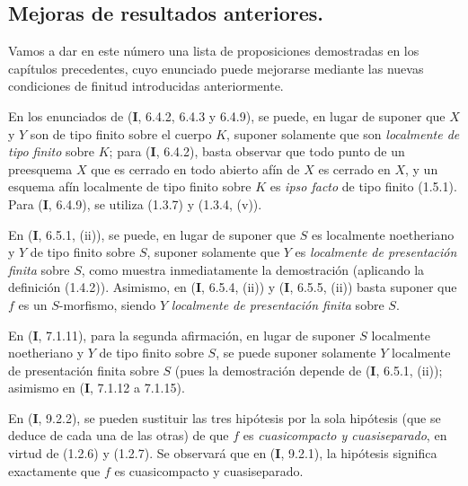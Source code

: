 \subsection{Mejoras de resultados anteriores.}
\label{subsection:IV.1.7-fr}

Vamos a dar en este número una lista de proposiciones demostradas en
los capítulos precedentes, cuyo enunciado puede mejorarse mediante las
nuevas condiciones de finitud introducidas anteriormente.

\begin{env}[1.7.1]
\label{IV.1.7.1-fr}
En los enunciados de (\textbf{I}, 6.4.2, 6.4.3 y 6.4.9), se puede, en lugar de suponer
que $X$ y $Y$ son de tipo finito sobre el cuerpo $K$, suponer solamente que
son \emph{localmente de tipo finito} sobre $K$; para (\textbf{I}, 6.4.2), basta
observar que todo punto de un preesquema $X$ que es cerrado en todo abierto
afín de $X$ es cerrado en $X$, y un esquema afín localmente de tipo finito
sobre $K$ es \emph{ipso facto} de tipo finito (1.5.1). Para (\textbf{I}, 6.4.9), se utiliza
(1.3.7) y (1.3.4, (v)).
\end{env}

\begin{env}[1.7.2]
\label{IV.1.7.2-fr}
En (\textbf{I}, 6.5.1, (ii)), se puede, en lugar de suponer que $S$ es localmente
noetheriano y $Y$ de tipo finito sobre $S$, suponer solamente que $Y$ es
\emph{localmente de presentación finita} sobre $S$, como muestra inmediatamente la
demostración (aplicando la definición (1.4.2)). Asimismo, en (\textbf{I}, 6.5.4,
(ii)) y (\textbf{I}, 6.5.5, (ii)) basta suponer que $f$ es un $S$-morfismo,
siendo $Y$ \emph{localmente de presentación finita} sobre $S$.
\end{env}

\begin{env}[1.7.3]
\label{IV.1.7.3-fr}
En (\textbf{I}, 7.1.11), para la segunda afirmación, en lugar de suponer $S$
localmente noetheriano y $Y$ de tipo finito sobre $S$, se puede suponer solamente
$Y$ localmente de presentación finita sobre $S$ (pues la demostración depende de
(\textbf{I}, 6.5.1, (ii)); asimismo en (\textbf{I}, 7.1.12 a 7.1.15).
\end{env}

\begin{env}[1.7.4]
En (\textbf{I}, 9.2.2), se pueden sustituir las tres hipótesis por la sola hipótesis
(que se deduce de cada una de las otras) de que $f$ es \emph{cuasicompacto y
cuasiseparado}, en virtud de (1.2.6) y (1.2.7). Se observará que en (\textbf{I}, 9.2.1),
la hipótesis significa exactamente que $f$ es cuasicompacto y cuasiseparado.
\end{env}


